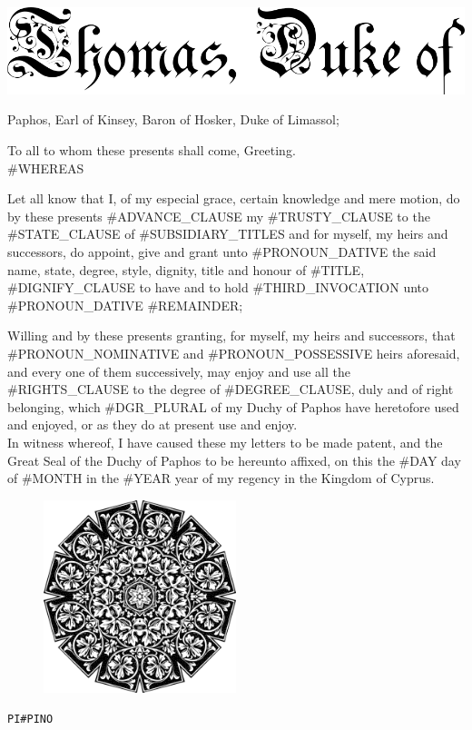 \documentclass[varwidth=true,border=50pt]{standalone}
\begin{document}
\thispagestyle{fancy}

\noindent \includegraphics[width=\textwidth]{thomas_duke_of}

{\LARGE
Paphos, Earl of Kinsey, Baron of Hosker, Duke of Limassol;

\setlength{\parindent}{20pt}

To all to whom these presents shall come, Greeting.\\

#WHEREAS

Let all know that I, of my especial grace, certain knowledge and mere motion, do by these presents #ADVANCE_CLAUSE my #TRUSTY_CLAUSE \hspace{7pt}{\hoskeroe #GRANTEE}\hspace{7pt} to the #STATE_CLAUSE of \hspace{7pt}{\hoskeroe #TITLE}\hspace{7pt} #SUBSIDIARY_TITLES and for myself, my heirs and successors, do appoint, give and grant unto #PRONOUN_DATIVE the said name, state, degree, style, dignity, title and honour of #TITLE, #DIGNIFY_CLAUSE to have and to hold #THIRD_INVOCATION unto #PRONOUN_DATIVE #REMAINDER;

Willing and by these presents granting, for myself, my heirs and successors, that #PRONOUN_NOMINATIVE and #PRONOUN_POSSESSIVE heirs aforesaid, and every one of them successively, may enjoy and use all the #RIGHTS_CLAUSE to the degree of #DEGREE_CLAUSE, duly and of right belonging, which #DGR_PLURAL of my Duchy of Paphos have heretofore used and enjoyed, or as they do at present use and enjoy.\\

In witness whereof, I have caused these my letters to be made patent, and the Great Seal of the Duchy of Paphos to be hereunto affixed, on this the #DAY day of #MONTH in the #YEAR year of my regency in the Kingdom of Cyprus.
}

\begin{figure}[h]
\centering
\includegraphics[width=0.5\textwidth]{seal}
\end{figure}

\hfill {\footnotesize \texttt{PI{#PINO}}}
\end{document}
